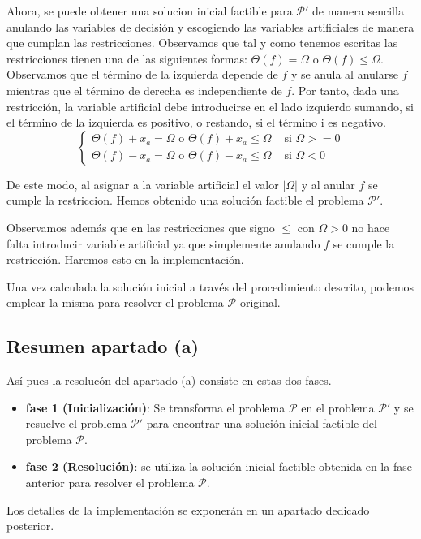 \documentclass[10pt,a4paper]{article}
\begin{document}
Ahora, se puede obtener una solucion inicial factible para $\mathcal{P'}$ de manera sencilla anulando las variables de decisión y escogiendo las variables artificiales de manera que cumplan las restricciones. Observamos que tal y como tenemos escritas las restricciones tienen una de las siguientes formas:
$\Theta(f) = \Omega$ o $\Theta(f) \leq \Omega$. Observamos que el término de la izquierda depende de $f$ y se anula al anularse $f$ mientras que el término de derecha es independiente de $f$. Por tanto, dada una restricción, la variable artificial debe introducirse en el lado izquierdo sumando, si el término de la izquierda es positivo, o restando, si el término i es negativo. 
\[
\begin{cases}
\Theta(f) + x_a = \Omega \text{ o }  \Theta(f) + x_a\leq \Omega &\text{ si } \Omega >= 0\\
\Theta(f) - x_a = \Omega \text{ o }  \Theta(f) - x_a\leq \Omega&\text{ si } \Omega < 0
\end{cases}
\]

De este modo, al asignar a la variable artificial el valor $|\Omega|$ y al anular $f$ se cumple la restriccion. Hemos obtenido una solución factible el problema $\mathcal{P'}$.

Observamos además que en las restricciones que signo $\leq$ con $\Omega > 0$ no hace falta introducir variable artificial ya que simplemente anulando $f$ se cumple la restricción. Haremos esto en la implementación.

Una vez calculada la solución inicial a través del procedimiento descrito, podemos emplear la misma para resolver el problema $\mathcal{P}$ original.

\subsection{Resumen apartado (a)}
Así pues la resolucón del apartado (a) consiste en estas dos fases.
\begin{itemize}
\item \textbf{fase 1 (Inicialización)}: Se transforma el problema $\mathcal{P}$ en el problema $\mathcal{P'}$ y se resuelve el problema $\mathcal{P'}$ para encontrar una solución inicial factible del problema $\mathcal{P}$.
\item \textbf{fase 2 (Resolución)}: se utiliza la solución inicial factible obtenida en la fase anterior para resolver el problema $\mathcal{P}$.
\end{itemize}
Los detalles de la implementación se exponerán en un apartado dedicado posterior.
\end{document}
